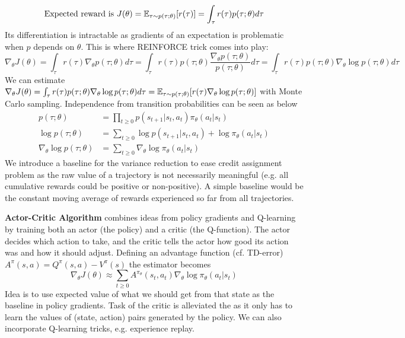 \documentclass[12pt]{article}
\begin{document}
\[ \text{Expected reward is } J(\theta) = \operatorname{\mathbb{E}}_{\tau \sim p(\tau ; \theta) } [r(\tau)] = \int_{\tau} r(\tau)p(\tau ; \theta) d\tau \]
Its differentiation is intractable as gradients of an expectation is problematic when $p$ depends on $\theta$. This is where REINFORCE trick comes into play:
\[
\nabla_{\theta} J(\theta) = \int_{\tau} r(\tau) \nabla_{\theta} p(\tau ; \theta) d\tau = \int_{\tau} r(\tau) p(\tau ; \theta) \frac{\nabla_{\theta} p(\tau ; \theta)}{p(\tau ; \theta)} d\tau = \int_{\tau} r(\tau) p(\tau ; \theta) \nabla_{\theta} \log p(\tau ; \theta) d\tau
\]
We can estimate $\nabla_{\theta} J(\theta) = \int_{\tau} r(\tau) p(\tau ; \theta) \nabla_{\theta} \log p(\tau ; \theta) d\tau = \operatorname{\mathbb{E}}_{\tau \sim p(\tau ; \theta)} [r(\tau) \nabla_{\theta} \log p(\tau ; \theta)] $ with Monte Carlo sampling. Independence from transition probabilities can be seen as below
\begin{equation*}
\begin{split}
p(\tau ; \theta) &= \prod\limits_{t\geq 0} p(s_{t+1}|s_t,a_t)\pi_{\theta} (a_t|s_t) \\
\log p(\tau ; \theta) &= \sum\limits_{t\geq 0} \log p(s_{t+1}|s_t,a_t) + \log \pi_{\theta} (a_t|s_t) \\
\nabla_{\theta} \log p(\tau ; \theta) &= \sum\limits_{t\geq 0} \nabla_{\theta} \log \pi_{\theta} (a_t|s_t)
\end{split}
\end{equation*}
We introduce a baseline for the variance reduction to ease credit assignment problem as the raw value of a trajectory is not necessarily meaningful (e.g. all cumulative rewards could be positive or non-positive). A simple baseline would be the constant moving average of rewards experienced so far from all trajectories.
\par \textbf{Actor-Critic Algorithm} combines ideas from policy gradients and Q-learning by training both an actor (the policy) and a critic (the Q-function). The actor decides which action to take, and the critic tells the actor how good its action was and how it should adjust. Defining an advantage function (cf. TD-error) $A^{\pi}(s,a) = Q^{\pi}(s,a) - V^{\pi}(s)$ the estimator becomes
\[ \nabla_{\theta} J(\theta) \approx \sum\limits_{t\geq 0} A^{\pi_{\theta}}(s_t,a_t) \nabla_{\theta} \log \pi_{\theta} (a_t|s_t) \]
Idea is to use expected value of what we should get from that state as the baseline in policy gradients. Task of the critic is alleviated the as it only has to learn the values
of (state, action) pairs generated by the policy. We can also incorporate Q-learning tricks, e.g. experience replay.
\end{document}
